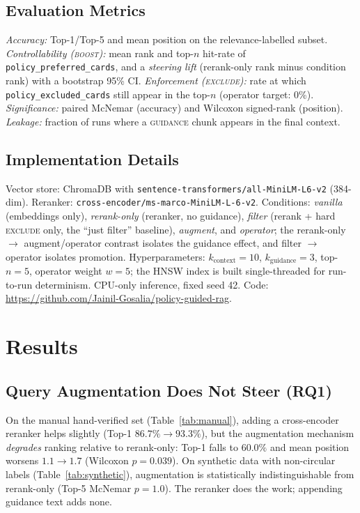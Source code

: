 \documentclass[11pt]{article}
\newcommand{\guidance}{\textsc{guidance}}
\begin{document}
\subsection{Evaluation Metrics}
\emph{Accuracy:} Top-1/Top-5 and mean position on the relevance-labelled subset.
\emph{Controllability (\textsc{boost}):} mean rank and top-$n$ hit-rate of
\texttt{policy\_preferred\_cards}, and a \emph{steering lift} (rerank-only rank minus condition
rank) with a bootstrap 95\% CI. \emph{Enforcement (\textsc{exclude}):} rate at which
\texttt{policy\_excluded\_cards} still appear in the top-$n$ (operator target: 0\%).
\emph{Significance:} paired McNemar (accuracy) and Wilcoxon signed-rank (position).
\emph{Leakage:} fraction of runs where a \guidance{} chunk appears in the final context.

\subsection{Implementation Details}
Vector store: ChromaDB with \texttt{sentence-transformers/all-MiniLM-L6-v2} (384-dim). Reranker:
\texttt{cross-encoder/ms-marco-MiniLM-L-6-v2}. Conditions: \emph{vanilla} (embeddings only),
\emph{rerank-only} (reranker, no guidance), \emph{filter} (rerank + hard \textsc{exclude} only,
the ``just filter'' baseline), \emph{augment}, and \emph{operator}; the rerank-only $\to$
augment/operator contrast isolates the guidance effect, and filter $\to$ operator isolates
promotion. Hyperparameters: $k_{\text{context}}{=}10$, $k_{\text{guidance}}{=}3$, top-$n{=}5$,
operator weight $w{=}5$; the HNSW index is built single-threaded for run-to-run determinism.
CPU-only inference, fixed seed 42. Code: \url{https://github.com/Jainil-Gosalia/policy-guided-rag}.

\section{Results}\label{sec:results}


\subsection{Query Augmentation Does Not Steer (RQ1)}
On the manual hand-verified set (Table~\ref{tab:manual}), adding a cross-encoder reranker helps
slightly (Top-1 $86.7\%\!\to\!93.3\%$), but the augmentation mechanism \emph{degrades} ranking
relative to rerank-only: Top-1 falls to $60.0\%$ and mean position worsens $1.1\!\to\!1.7$
(Wilcoxon $p{=}0.039$). On synthetic data with non-circular labels (Table~\ref{tab:synthetic}),
augmentation is statistically indistinguishable from rerank-only (Top-5 McNemar $p{=}1.0$). The
reranker does the work; appending guidance text adds none.
\end{document}
